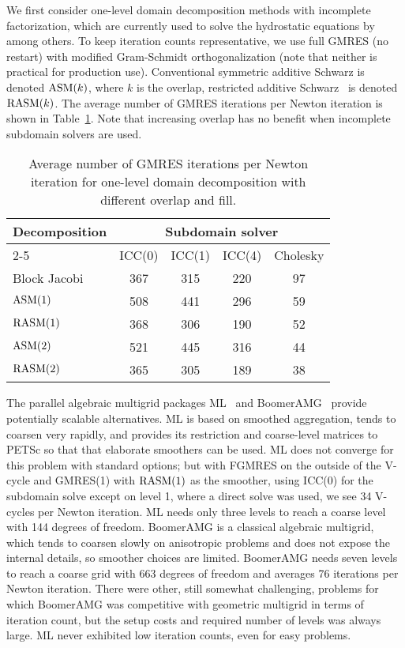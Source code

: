 We first consider one-level domain decomposition methods with incomplete factorization, which are currently used to solve the hydrostatic equations by \citep{seacism,issm} among others.  To keep iteration counts representative, we use full GMRES (no restart) with modified Gram-Schmidt orthogonalization (note that neither is practical for production use).  Conventional symmetric additive Schwarz is denoted $\mathrm{ASM}(k)$, where $k$ is the overlap, restricted additive Schwarz~\citep{cai1999restricted} is denoted $\mathrm{RASM}(k)$.  The average number of GMRES iterations per Newton iteration is shown in Table~\ref{tab:1level}.  Note that increasing overlap has no benefit when incomplete subdomain solvers are used.

\begin{table}
  \centering\caption{Average number of GMRES iterations per Newton iteration for one-level domain decomposition with different overlap and fill.}\label{tab:1level}
  \begin{tabular}{lcccc}
    \toprule
    \multirow{3}{*}{Decomposition} & \multicolumn{4}{c}{Subdomain solver} \\
    \cmidrule{2-5}
     & ICC(0) & ICC(1) & ICC(4) & Cholesky \\
    \midrule
    Block Jacobi & 367 & 315 & 220 & 97 \\
    $\mathrm{ASM}(1)$     & 508 & 441 & 296 & 59 \\
    $\mathrm{RASM}(1)$    & 368 & 306 & 190 & 52 \\
    $\mathrm{ASM}(2)$     & 521 & 445 & 316 & 44 \\
    $\mathrm{RASM}(2)$    & 365 & 305 & 189 & 38 \\
    \bottomrule
  \end{tabular}
\end{table}

The parallel algebraic multigrid packages ML~\citep{ml-guide} and BoomerAMG~\citep{henson2002bpa} provide potentially scalable alternatives.  ML is based on smoothed aggregation, tends to coarsen very rapidly, and provides its restriction and coarse-level matrices to PETSc so that that elaborate smoothers can be used.  ML does not converge for this problem with standard options; but with FGMRES on the outside of the V-cycle and GMRES(1) with $\mathrm{RASM}(1)$ as the smoother, using ICC(0) for the subdomain solve except on level 1, where a direct solve was used, we see 34 V-cycles per Newton iteration.  ML needs only three levels to reach a coarse level with 144 degrees of freedom.  BoomerAMG is a classical algebraic multigrid, which tends to coarsen slowly on anisotropic problems and does not expose the internal details, so smoother choices are limited.  BoomerAMG needs seven levels to reach a coarse grid with 663 degrees of freedom and averages 76 iterations per Newton iteration.  There were other, still somewhat challenging, problems for which BoomerAMG was competitive with geometric multigrid in terms of iteration count, but the setup costs and required number of levels was always large.  ML never exhibited low iteration counts, even for easy problems.

